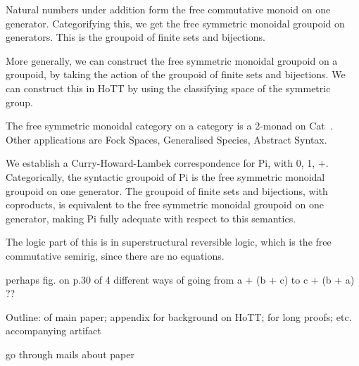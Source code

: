Natural numbers under addition form the free commutative monoid on one
generator. Categorifying this, we get the free symmetric monoidal groupoid on
generators. This is the groupoid of finite sets and bijections.

More generally, we can construct the free symmetric monoidal groupoid on a
groupoid, by taking the action of the groupoid of finite sets and bijections. We
can construct this in HoTT by using the classifying space of the symmetric
group.

The free symmetric monoidal category on a category is a 2-monad on
Cat~\cite{blackwellTwodimensionalMonadTheory1989,abramskyAbstractScalarsLoops2005,leinsterHigherOperadsHigher2004}.
Other applications are Fock Spaces, Generalised Species, Abstract Syntax.

We establish a Curry-Howard-Lambek correspondence for Pi, with 0, 1,
+. Categorically, the syntactic groupoid of Pi is the free symmetric monoidal
groupoid on one generator. The groupoid of finite sets and bijections, with
coproducts, is equivalent to the free symmetric monoidal groupoid on one
generator, making Pi fully adequate with respect to this semantics.

The logic part of this is in superstructural reversible logic, which is the free
commutative semirig, since there are no equations.

perhaps fig. on p.30 of 4 different ways of going from a + (b + c) to c + (b + a) ??

Outline: of main paper; appendix for background on HoTT; for long proofs;
etc. accompanying artifact

go through mails about paper



